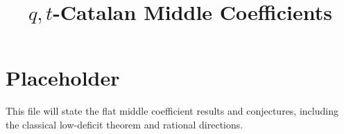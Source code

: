 \documentclass{article}
\title{\texorpdfstring{$q,t$}{qt}-Catalan Middle Coefficients}
\author{}
\date{}
\begin{document}
\maketitle

\section{Placeholder}

This file will state the flat middle coefficient results and conjectures,
including the classical low-deficit theorem and rational directions.
\end{document}
